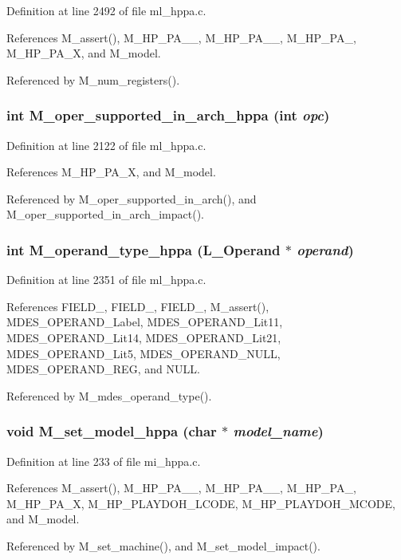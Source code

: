 Definition at line 2492 of file ml\_\-hppa.c.

References M\_\-assert(), M\_\-HP\_\-PA\_\_, M\_\-HP\_\-PA\_\_, M\_\-HP\_\-PA\_, M\_\-HP\_\-PA\_\-X, and M\_\-model.

Referenced by M\_\-num\_\-registers().
\subsubsection{\setlength{\rightskip}{0pt plus 5cm}int M\_\-oper\_\-supported\_\-in\_\-arch\_\-hppa (int {\em opc})}\label{m__hppa_8h_abb2dba60a9f9529009d31eaa55a5840}




Definition at line 2122 of file ml\_\-hppa.c.

References M\_\-HP\_\-PA\_\-X, and M\_\-model.

Referenced by M\_\-oper\_\-supported\_\-in\_\-arch(), and M\_\-oper\_\-supported\_\-in\_\-arch\_\-impact().
\subsubsection{\setlength{\rightskip}{0pt plus 5cm}int M\_\-operand\_\-type\_\-hppa (L\_\-Operand $\ast$ {\em operand})}\label{m__hppa_8h_324c65ae6f64ef5b6b79a81834ac1924}




Definition at line 2351 of file ml\_\-hppa.c.

References FIELD\_, FIELD\_, FIELD\_, M\_\-assert(), MDES\_\-OPERAND\_\-Label, MDES\_\-OPERAND\_\-Lit11, MDES\_\-OPERAND\_\-Lit14, MDES\_\-OPERAND\_\-Lit21, MDES\_\-OPERAND\_\-Lit5, MDES\_\-OPERAND\_\-NULL, MDES\_\-OPERAND\_\-REG, and NULL.

Referenced by M\_\-mdes\_\-operand\_\-type().
\subsubsection{\setlength{\rightskip}{0pt plus 5cm}void M\_\-set\_\-model\_\-hppa (char $\ast$ {\em model\_\-name})}\label{m__hppa_8h_21c39049e128e6bfeced8eb8de6e2565}




Definition at line 233 of file mi\_\-hppa.c.

References M\_\-assert(), M\_\-HP\_\-PA\_\_, M\_\-HP\_\-PA\_\_, M\_\-HP\_\-PA\_, M\_\-HP\_\-PA\_\-X, M\_\-HP\_\-PLAYDOH\_\-LCODE, M\_\-HP\_\-PLAYDOH\_\-MCODE, and M\_\-model.

Referenced by M\_\-set\_\-machine(), and M\_\-set\_\-model\_\-impact().